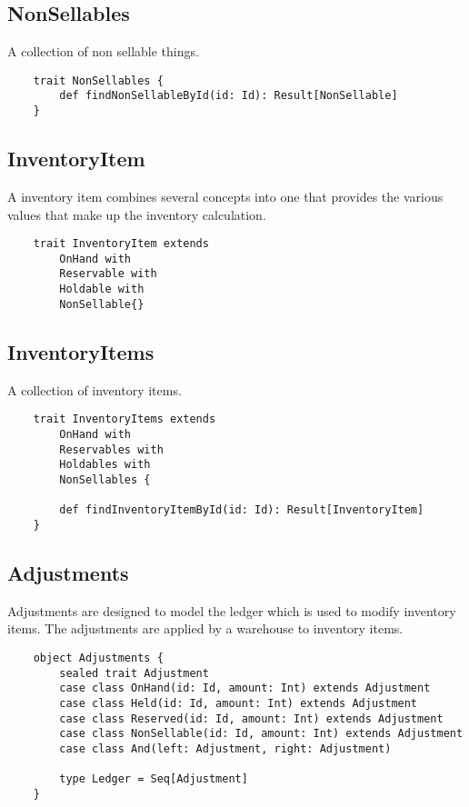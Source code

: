 \documentclass[11pt]{article}
\begin{document}
\subsection{NonSellables}

A collection of non sellable things. 

\begin{lstlisting}
    trait NonSellables {
        def findNonSellableById(id: Id): Result[NonSellable]
    }
\end{lstlisting}

\subsection{InventoryItem}

A inventory item combines several concepts into one that provides the various values that
make up the inventory calculation.

\begin{lstlisting}
    trait InventoryItem extends 
        OnHand with 
        Reservable with
        Holdable with
        NonSellable{}
\end{lstlisting}

\subsection{InventoryItems}

A collection of inventory items.

\begin{lstlisting}
    trait InventoryItems extends
        OnHand with
        Reservables with
        Holdables with
        NonSellables {

        def findInventoryItemById(id: Id): Result[InventoryItem]
    }
\end{lstlisting}

\subsection{Adjustments}

Adjustments are designed to model the ledger which is used to modify inventory items.
The adjustments are applied by a warehouse to inventory items.

\begin{lstlisting}
    object Adjustments {
        sealed trait Adjustment
        case class OnHand(id: Id, amount: Int) extends Adjustment
        case class Held(id: Id, amount: Int) extends Adjustment
        case class Reserved(id: Id, amount: Int) extends Adjustment
        case class NonSellable(id: Id, amount: Int) extends Adjustment
        case class And(left: Adjustment, right: Adjustment)

        type Ledger = Seq[Adjustment]
    }
\end{lstlisting}
\end{document}
